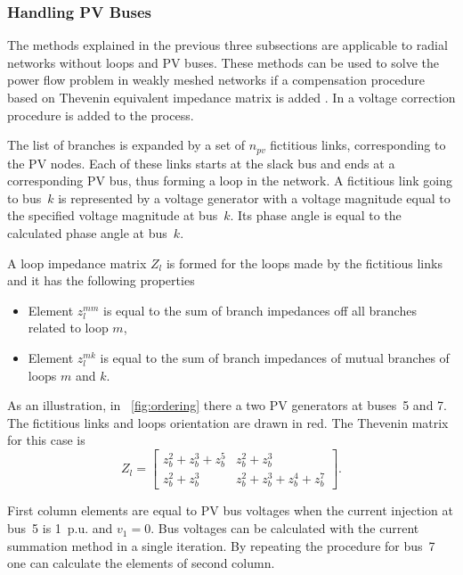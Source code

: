 \documentclass[12pt]{article}
\numberwithin{equation}{section}
\numberwithin{table}{section}
\numberwithin{figure}{section}
\begin{document}
\subsubsection{Handling PV Buses}
The methods explained in the previous three subsections are applicable to radial networks without loops and PV buses. These methods can be used to solve the power flow problem in weakly meshed networks if a compensation procedure based on Thevenin equivalent impedance matrix is added \cite{shirmohammadi1988,luo1990}. In \cite{rajicic1994} a voltage correction procedure is added to the process.

The list of branches is expanded by a set
of $n_{pv}$ fictitious links, corresponding to the PV nodes. Each of these links starts at the slack bus and ends at a corresponding PV bus, thus forming a loop in the network. A fictitious link going to bus~$k$ is represented by a voltage generator with a voltage magnitude equal to the specified voltage magnitude at bus~$k$. Its phase angle is equal to the calculated phase angle at bus~$k$.

A loop impedance matrix $Z_l$ is formed for the loops made by the fictitious links and it has the following properties
\begin{itemize}
\item Element $z_l^{mm}$ is equal to the sum of branch impedances off all branches related to loop $m$,
\item Element $z_l^{mk}$ is equal to the sum of branch impedances of mutual branches of loops $m$ and $k$.
\end{itemize}

As an illustration, in \figurename~\ref{fig:ordering} there a two PV generators at buses~5 and 7. The fictitious links and loops orientation are drawn in red. The Thevenin matrix for this case is
\begin{equation*}
Z_l = \left[\begin{array}{cc}
z_b^2 + z_b^3 + z_b^5 & z_b^2 + z_b^3 \\
z_b^2 + z_b^3 & z_b^2 + z_b^3 + z_b^4 + z_b^7
\end{array}
\right].
\end{equation*}

First column elements are equal to PV bus voltages when the current injection at bus~5 is 1~p.u. and $v_1 = 0$. Bus voltages can be calculated with the current summation method in a single iteration. By repeating the procedure for bus~7 one can calculate the elements of second column.
\end{document}
